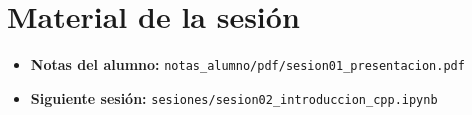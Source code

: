 \documentclass[12pt, oneside]{article}
\begin{document}
\section{Material de la sesión}

\begin{itemize}
  \item \textbf{Notas del alumno:}
        \texttt{notas\_alumno/pdf/sesion01\_presentacion.pdf}
  \item \textbf{Siguiente sesión:}
        \texttt{sesiones/sesion02\_introduccion\_cpp.ipynb}
\end{itemize}
\end{document}
